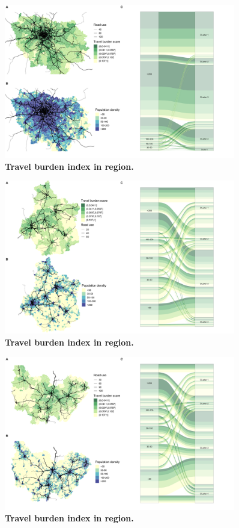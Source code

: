 \begin{figure}[H]
    \includegraphics[width=0.9\textwidth]{images/routes/fig4_11.png}
    \centering
    \caption{
        \textbf{Travel burden index in region.}
    }
\end{figure}

\begin{figure}[H]
    \includegraphics[width=0.9\textwidth]{images/routes/fig4_24.png}
    \centering
    \caption{
        \textbf{Travel burden index in region.}
    }
\end{figure}

\begin{figure}[H]
    \includegraphics[width=0.9\textwidth]{images/routes/fig4_27.png}
    \centering
    \caption{
        \textbf{Travel burden index in region.}
    }
\end{figure}

